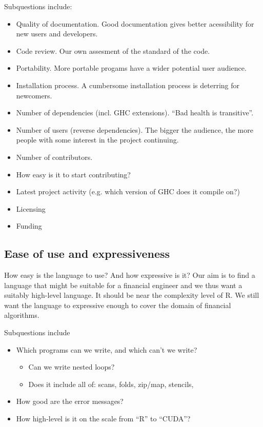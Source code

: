 Subquestions include:
\begin{itemize}
\item Quality of documentation. Good documentation gives better acessibility for new users and developers.
\item Code review. Our own assesment of the standard of the code.
\item Portability. More portable progams have a wider potential user audience.
\item Installation process. A cumbersome installation process is deterring for newcomers.
\item Number of dependencies (incl. GHC extensions). ``Bad health is transitive''.
\item Number of users (reverse dependencies). The bigger the audience, the more people with some interest in the project continuing.
\item Number of contributors.
\item How easy is it to start contributing?
\item Latest project activity (e.g. which version of GHC does it compile on?)
\item Licensing
\item Funding
\end{itemize}


\subsection{Ease of use and expressiveness}

How easy is the language to use? And how expressive is it? Our
aim is to find a language that might be suitable for a financial
engineer and we thus want a suitably high-level language. It should
be near the complexity level of R. We still want the language to
expressive enough to cover the domain of financial algorithms.

Subquestions include
\begin{itemize}
\item Which programs can we write, and which can't we write?
  \begin{itemize}
  \item Can we write nested loops?
  \item Does it include all of: scans, folds, zip/map, stencils,
  \end{itemize}
\item How good are the error messages?
\item How high-level is it on the scale from ``R'' to ``CUDA''?
\end{itemize}

